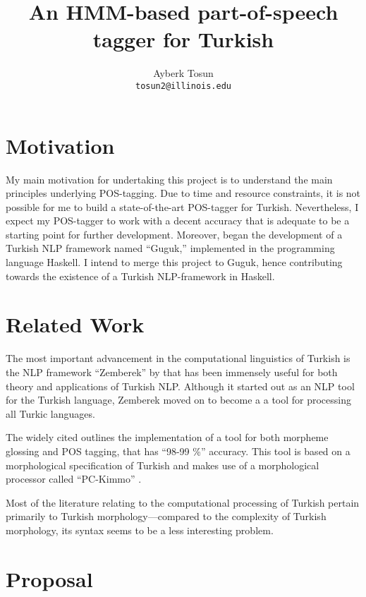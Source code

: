 \documentclass{article}
\title{\bf An HMM-based part-of-speech tagger for Turkish}
\author{Ayberk Tosun\\\texttt{tosun2@illinois.edu}}
\date{}
\begin{document}
\maketitle

\section{Motivation}
\label{sec:motivation}
My main motivation for undertaking this project is to understand the main
principles underlying POS-tagging. Due to time and resource constraints, it is
not possible for me to build a state-of-the-art POS-tagger for
Turkish. Nevertheless, I expect my POS-tagger
to work with a decent accuracy that is adequate to be a starting point for
further development. Moreover, \citet{Korkut2015} began the development of a
Turkish NLP framework named ``Guguk,'' implemented in the programming language Haskell. I intend
to merge this project to Guguk, hence contributing towards
the existence of a Turkish NLP-framework in Haskell.

\section{Related Work}
\label{sec:related_work}

The most important advancement in the computational linguistics of Turkish is
the NLP framework ``Zemberek'' by \citet{akin2007zemberek} that has been
immensely useful for both theory and applications of Turkish NLP. Although it started
out as an NLP tool for the Turkish language, Zemberek moved on to become a
a tool for processing all Turkic languages.

The widely cited \citet{oflazer1994tagging} outlines the implementation of a
tool for both morpheme glossing and POS tagging, that has ``98-99 \%'' accuracy. This
tool is based on a morphological specification of Turkish and makes use of a
morphological processor called ``PC-Kimmo'' \citep{antworth1991pc}.

Most of the literature relating to the computational processing of Turkish
pertain primarily to Turkish morphology---compared to the complexity of Turkish
morphology, its syntax seems to be a less interesting problem.
\section{Proposal}
\end{document}

